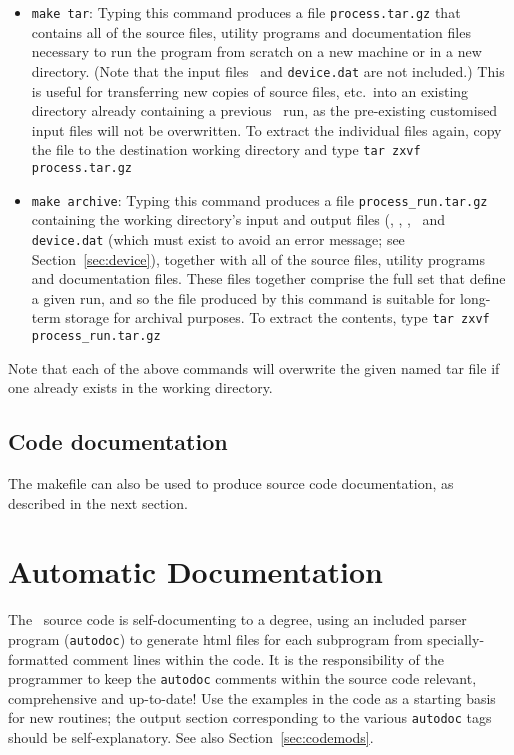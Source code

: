 \begin{itemize}

\item \texttt{make tar}: Typing this command produces a file
  \texttt{process.tar.gz} that contains all of the source files, utility
  programs and documentation files necessary to run the program from scratch
  on a new machine or in a new directory. (Note that the input files \indat\
  and \texttt{device.dat} are not included.) This is useful for transferring
  new copies of source files, etc.\ into an existing directory already
  containing a previous \process\ run, as the pre-existing customised input
  files will not be overwritten. To extract the individual files again, copy
  the file to the destination working directory and type
  \verb+tar zxvf process.tar.gz+

\item \texttt{make archive}: Typing this command produces a file
  \texttt{process\_run.tar.gz} containing the working directory's input and
  output files (\indat, \outdat, \plotdat, \mfile\ and \texttt{device.dat}
  (which must exist to avoid an error message; see Section~\ref{sec:device}),
  together with all of the source files, utility programs and documentation
  files. These files together comprise the full set that define a given run,
  and so the file produced by this command is suitable for long-term storage
  for archival purposes. To extract the contents, type
  \verb+tar zxvf process_run.tar.gz+
\end{itemize}

Note that each of the above commands will overwrite the given named tar file
if one already exists in the working directory.

\subsection{Code documentation}

The makefile can also be used to produce source code documentation, as
described in the next section.

\section{Automatic Documentation}
\label{sec:autodoc}

The \process\ source code is self-documenting to a degree, using an included
parser program (\texttt{autodoc}) to generate html files for each subprogram
from specially-formatted comment lines within the code. It is the
responsibility of the programmer to keep the \texttt{autodoc} comments within
the source code relevant, comprehensive and up-to-date! Use the examples in
the code as a starting basis for new routines; the output section
corresponding to the various \texttt{autodoc} tags should be
self-explanatory. See also Section~\ref{sec:codemods}.

